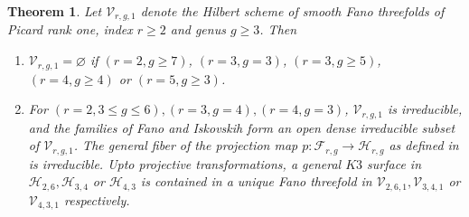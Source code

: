\documentclass[11pt,twoside]{amsart}
\theoremstyle{plain}
\numberwithin{equation}{section}
\newtheorem{theorem}{Theorem}[section]
\theoremstyle{definition}
\begin{document}
\begin{theorem}\label{classification of fanos with index two}
Let $\mathcal{V}_{r,g,1}$ denote the Hilbert scheme of smooth Fano threefolds of Picard rank one, index $r \geq 2$ and genus $g \geq 3$. Then 
\begin{enumerate}
    \item $\mathcal{V}_{r,g,1} = \varnothing$ if $(r = 2, g \geq 7)$, $(r = 3, g = 3)$, $(r = 3, g \geq 5)$, $(r = 4, g \geq 4)$ or $(r = 5, g \geq 3)$. 
    \item For $(r = 2, 3 \leq g \leq 6), (r = 3, g = 4), (r = 4, g = 3)$, $\mathcal{V}_{r,g,1}$ is irreducible, and the families of Fano and Iskovskih form an open dense irreducible subset of $\mathcal{V}_{r,g,1}$. The general fiber of the projection map $p: \mathcal{F}_{r,g} \to \mathcal{H}_{r,g}$ as defined in  is irreducible. Upto projective transformations, a general $K3$ surface in $\mathcal{H}_{2,6}, \mathcal{H}_{3,4}$ or $ \mathcal{H}_{4,3}$ is contained in a unique Fano threefold in $\mathcal{V}_{2,6,1}, \mathcal{V}_{3,4,1}$ or $ \mathcal{V}_{4,3,1}$ respectively.
\end{enumerate}
\end{theorem}
\end{document}
